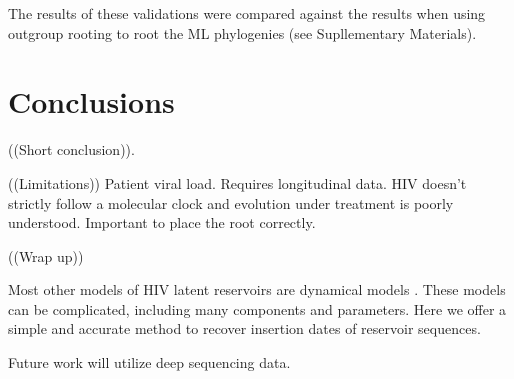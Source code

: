 \documentclass[12pt,onecolumn,twoside]{pnas-new}
\begin{document}
The results of these validations were compared against the results when using outgroup rooting to root the ML phylogenies (see Supllementary Materials).

\section*{Conclusions}
((Short conclusion)).

((Limitations))
Patient viral load.
Requires longitudinal data.
HIV doesn't strictly follow a molecular clock and evolution under treatment is poorly understood.
Important to place the root correctly.

((Wrap up))

Most other models of HIV latent reservoirs are dynamical models \cite{Rong09,Pace11}.
These models can be complicated, including many components and parameters.
Here we offer a simple and accurate method to recover insertion dates of reservoir sequences.

Future work will utilize deep sequencing data.
\end{document}
